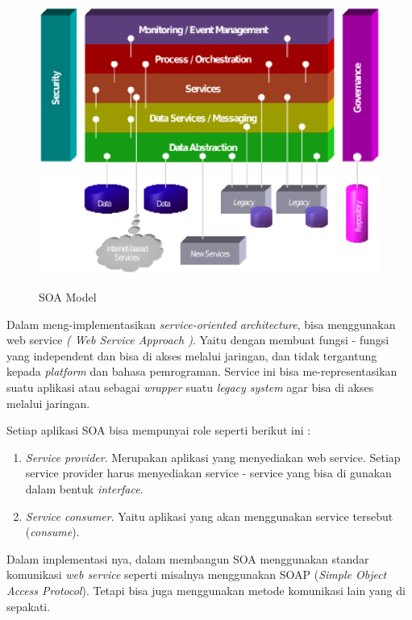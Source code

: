 \documentclass[9pt,twocolumn,twoside]{Gunadarma}
\begin{document}
\begin{figure}[htbp]
\begin{center}
\includegraphics[width=1\columnwidth]{SOA_Metamodel.eps} \label{fig:3-noFCase1}
\end{center}
\caption{SOA Model}
\end{figure}

Dalam meng-implementasikan \textit{service-oriented architecture}, bisa menggunakan web service \textit{( Web Service Approach )}. Yaitu dengan membuat fungsi - fungsi yang independent dan bisa di akses melalui jaringan, dan tidak tergantung kepada \textit{platform} dan bahasa pemrograman. Service ini bisa me-representasikan suatu aplikasi atau sebagai \textit{wrapper} suatu \textit{legacy system} agar bisa di akses melalui jaringan. 

Setiap aplikasi SOA bisa mempunyai role seperti berikut ini :
\begin{enumerate}
\item \textit{Service provider}. Merupakan aplikasi yang menyediakan web service. Setiap service provider harus menyediakan service - service yang bisa di gunakan dalam bentuk \textit{interface}. 
\item \textit{Service consumer}. Yaitu aplikasi yang akan menggunakan service tersebut (\textit{consume}). 
\end{enumerate}

Dalam implementasi nya, dalam membangun SOA menggunakan standar komunikasi \textit{web service} seperti misalnya menggunakan SOAP (\textit{Simple Object Access Protocol}). Tetapi bisa juga menggunakan metode komunikasi lain yang di sepakati. 
\end{document}
